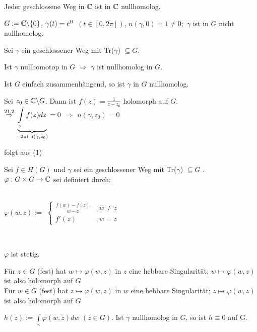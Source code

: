 \documentclass[a4paper,twoside,DIV15,BCOR12mm]{scrbook}
\def\wegint{\ensuremath{\int\limits_\gamma}}
\def\ie{\rm i}
\begin{document}
\begin{beispiele}
\begin{liste}
\item Jeder geschlossene Weg in $\mathbb{C}$ ist in $\mathbb{C}$ nullhomolog.
\item $G := \mathbb{C} \backslash \{0\}$, $\gamma(t) = e^{\ie t}$ $(t\in [0,2\pi])$,
$n(\gamma,0) = 1 \neq 0;$ $\gamma$ ist in $G$ nicht nullhomolog.
\end{liste}
\end{beispiele}

\begin{satz}
Sei $\gamma$ ein geschlossener Weg mit Tr($\gamma$) $\subseteq G$.
\begin{liste}
\item Ist $\gamma$ nullhomotop in $G$ $\Rightarrow$ $\gamma$ ist nullhomolog in
$G$. 
\item Ist $G$ einfach zusammenhängend, so ist $\gamma$ in $G$ nullhomolog.
\end{liste}
\end{satz}
\begin{beweis}
\begin{liste}
\item Sei $z_0 \in \mathbb{C} \backslash G$. Dann ist $f(z) = \frac{1}{z-z_0}$
holomorph auf $G$. \\ $\stackrel{\text{21.2}}{\Rightarrow} \underbrace{\wegint
f(z) dz}_{= 2 \pi \ie \text{ } n(\gamma, z_0)}=0$ $\Rightarrow$ $n(\gamma, z_0) =
0$
\item folgt aus (1)
\end{liste}
\end{beweis}
\begin{satz}
Sei $f \in H(G)$ und $\gamma$ sei ein geschlossener Weg mit Tr($\gamma$)
$\subseteq G$ . \\
$\varphi: G \times G \to \mathbb{C}$ sei definiert durch: \\ \\
\centerline{$\varphi(w,z) := $
$\begin{cases}
\frac{f(w)-f(z)}{w-z}& , w \neq z \\
f'(z)  & , w = z
\end{cases}$} \\
\begin{liste}
\item $\varphi$ ist stetig.
\item Für $z \in G$ (fest) hat $w \mapsto \varphi(w, z)$ in $z$ eine hebbare
Singularität; $w \mapsto \varphi(w, z)$ ist also holomorph auf $G$ \\
Für $w \in G$ (fest) hat $z \mapsto \varphi(w, z)$ in $w$ eine hebbare
Singularität; $z \mapsto \varphi(w, z)$ ist also holomorph auf $G$
\item $h(z) := \wegint \varphi(w,z) dw$ $(z\in G)$. Ist $\gamma$ nullhomolog in
$G$, so ist $h \equiv 0$ auf G.
\end{liste} 
\end{satz}
\end{document}
